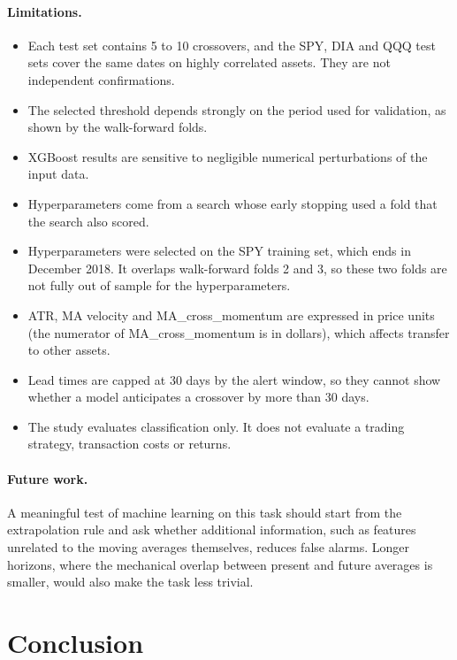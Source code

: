 \documentclass[11pt,a4paper]{article}
\begin{document}
\paragraph{Limitations.}
\begin{itemize}
  \item Each test set contains 5 to 10 crossovers, and the SPY, DIA and QQQ test sets cover the
        same dates on highly correlated assets. They are not independent confirmations.
  \item The selected threshold depends strongly on the period used for validation, as shown by
        the walk-forward folds.
  \item XGBoost results are sensitive to negligible numerical perturbations of the input data.
  \item Hyperparameters come from a search whose early stopping used a fold that the search also
        scored.
  \item Hyperparameters were selected on the SPY training set, which ends in December 2018. It
        overlaps walk-forward folds 2 and 3, so these two folds are not fully out of sample for
        the hyperparameters.
  \item ATR, MA velocity and MA\_cross\_momentum are expressed in price units (the numerator of
        MA\_cross\_momentum is in dollars), which affects transfer to other assets.
  \item Lead times are capped at 30 days by the alert window, so they cannot show whether a model
        anticipates a crossover by more than 30 days.
  \item The study evaluates classification only. It does not evaluate a trading strategy,
        transaction costs or returns.
\end{itemize}

\paragraph{Future work.} A meaningful test of machine learning on this task should start from the
extrapolation rule and ask whether additional information, such as features unrelated to the
moving averages themselves, reduces false alarms. Longer horizons, where the mechanical overlap
between present and future averages is smaller, would also make the task less trivial.

\section{Conclusion}
\end{document}
